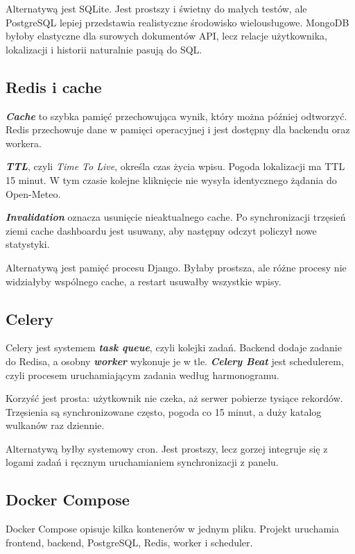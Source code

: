 \documentclass[14pt,a5paper,oneside]{extarticle}
\newcommand{\term}[1]{\textbf{\textit{#1}}}
\begin{document}
Alternatywą jest SQLite. Jest prostszy i świetny do małych testów, ale
PostgreSQL lepiej przedstawia realistyczne środowisko wielousługowe.
MongoDB byłoby elastyczne dla surowych dokumentów API, lecz relacje
użytkownika, lokalizacji i historii naturalnie pasują do SQL.

\subsection{Redis i cache}

\term{Cache} to szybka pamięć przechowująca wynik, który można później
odtworzyć. Redis przechowuje dane w pamięci operacyjnej i jest dostępny dla
backendu oraz workera.

\term{TTL}, czyli \textit{Time To Live}, określa czas życia wpisu. Pogoda
lokalizacji ma TTL 15 minut. W tym czasie kolejne kliknięcie nie wysyła
identycznego żądania do Open-Meteo.

\term{Invalidation} oznacza usunięcie nieaktualnego cache. Po synchronizacji
trzęsień ziemi cache dashboardu jest usuwany, aby następny odczyt policzył
nowe statystyki.

Alternatywą jest pamięć procesu Django. Byłaby prostsza, ale różne procesy
nie widziałyby wspólnego cache, a restart usuwałby wszystkie wpisy.

\subsection{Celery}

Celery jest systemem \term{task queue}, czyli kolejki zadań. Backend dodaje
zadanie do Redisa, a osobny \term{worker} wykonuje je w tle.
\term{Celery Beat} jest schedulerem, czyli procesem uruchamiającym zadania
według harmonogramu.

Korzyść jest prosta: użytkownik nie czeka, aż serwer pobierze tysiące
rekordów. Trzęsienia są synchronizowane często, pogoda co 15 minut, a duży
katalog wulkanów raz dziennie.

Alternatywą byłby systemowy cron. Jest prostszy, lecz gorzej integruje się
z logami zadań i ręcznym uruchamianiem synchronizacji z panelu.

\subsection{Docker Compose}

Docker Compose opisuje kilka kontenerów w jednym pliku. Projekt uruchamia
frontend, backend, PostgreSQL, Redis, worker i scheduler.
\end{document}
